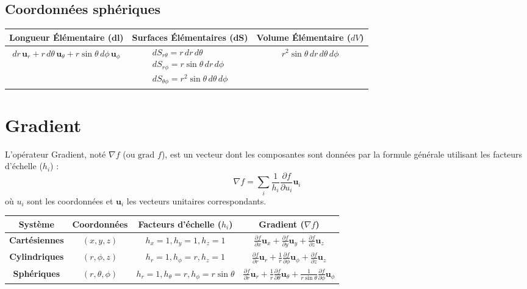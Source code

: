 \documentclass[french]{yLectureNote}
\begin{document}
\subsection{Coordonnées sphériques}
\begin{tabular}{|c|c|c|}
        \hline
         \textbf{Longueur Élémentaire} ($\mathbf{dl}$) & \textbf{Surfaces Élémentaires} ($\mathbf{dS}$) & \textbf{Volume Élémentaire} ($dV$) \\
        \hline
        $dr\, \mathbf{u}_r + r\, d\theta\, \mathbf{u}_{\theta} + r \sin\theta\, d\phi\, \mathbf{u}_{\phi}$ & $\begin{array}{l} dS_{r\theta} = r\, dr\, d\theta \\ dS_{r\phi} = r \sin\theta\, dr\, d\phi \\ dS_{\theta\phi} = r^2 \sin\theta\, d\theta\, d\phi \end{array}$ & $r^2 \sin\theta\, dr\, d\theta\, d\phi$ \\
        \hline
    \end{tabular}
\section{Gradient}
L'opérateur Gradient, noté $\nabla f$ (ou $\text{grad } f$), est un vecteur dont les composantes sont données par la formule générale utilisant les facteurs d'échelle ($h_i$) :
$$
\nabla f = \sum_{i} \frac{1}{h_i} \frac{\partial f}{\partial u_i} \mathbf{u}_i
$$
où $u_i$ sont les coordonnées et $\mathbf{u}_i$ les vecteurs unitaires correspondants.

    \label{tab:gradient_expressions}
    \renewcommand{\arraystretch}{2.5} %
    \begin{tabular}{|c|c|c|c|}
        \hline
        \textbf{Système} & \textbf{Coordonnées} & \textbf{Facteurs d'échelle ($h_i$)} & \textbf{Gradient ($\nabla f$)} \\
        \hline
        \textbf{Cartésiennes} & $(x, y, z)$ & $h_x=1, h_y=1, h_z=1$ & $\frac{\partial f}{\partial x} \mathbf{u}_x + \frac{\partial f}{\partial y} \mathbf{u}_y + \frac{\partial f}{\partial z} \mathbf{u}_z$ \\
        \hline
        \textbf{Cylindriques} & $(r, \phi, z)$ & $h_r=1, h_{\phi}=r, h_z=1$ & $\frac{\partial f}{\partial r} \mathbf{u}_r + \frac{1}{r} \frac{\partial f}{\partial \phi} \mathbf{u}_{\phi} + \frac{\partial f}{\partial z} \mathbf{u}_z$ \\
        \hline
        \textbf{Sphériques} & $(r, \theta, \phi)$ & $h_r=1, h_{\theta}=r, h_{\phi}=r \sin\theta$ & $\frac{\partial f}{\partial r} \mathbf{u}_r + \frac{1}{r} \frac{\partial f}{\partial \theta} \mathbf{u}_{\theta} + \frac{1}{r \sin\theta} \frac{\partial f}{\partial \phi} \mathbf{u}_{\phi}$ \\
        \hline
    \end{tabular}
 
\end{document}

